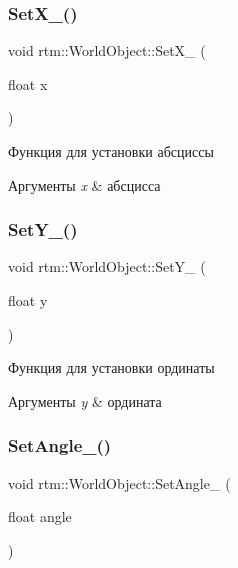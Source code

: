 \subsubsection{\texorpdfstring{Set\+X\+\_\+()}{SetX\_()}}
{\footnotesize\ttfamily void rtm\+::\+World\+Object\+::\+Set\+X\+\_\+ (\begin{DoxyParamCaption}\item[{float}]{x }\end{DoxyParamCaption})\hspace{0.3cm}{\ttfamily [protected]}}



Функция для установки абсциссы 


\begin{DoxyParams}{Аргументы}
{\em x} & абсцисса \\
\hline
\end{DoxyParams}
\mbox{\label{classrtm_1_1_world_object_a2d9de0f03e711f7b2486889d7336c9d3}} 
\subsubsection{\texorpdfstring{Set\+Y\+\_\+()}{SetY\_()}}
{\footnotesize\ttfamily void rtm\+::\+World\+Object\+::\+Set\+Y\+\_\+ (\begin{DoxyParamCaption}\item[{float}]{y }\end{DoxyParamCaption})\hspace{0.3cm}{\ttfamily [protected]}}



Функция для установки ординаты 


\begin{DoxyParams}{Аргументы}
{\em y} & ордината \\
\hline
\end{DoxyParams}
\mbox{\label{classrtm_1_1_world_object_a3185c36d5138dde6f6942b101586cee4}} 
\subsubsection{\texorpdfstring{Set\+Angle\+\_\+()}{SetAngle\_()}}
{\footnotesize\ttfamily void rtm\+::\+World\+Object\+::\+Set\+Angle\+\_\+ (\begin{DoxyParamCaption}\item[{float}]{angle }\end{DoxyParamCaption})\hspace{0.3cm}{\ttfamily [protected]}}



